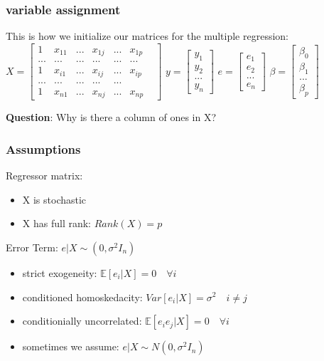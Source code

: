 \documentclass{beamer}
\begin{document}
\begin{frame}
\frametitle{variable assignment}
This is how we initialize our matrices for the multiple regression:
\bigskip
\bigskip
$
X = 
\begin{bmatrix} 
1 & x_{11} & ...& x_{1j} & ... & x_{1p} \\
...& ... & ... &...& ...& ...\\
1 & x_{i1} & ... & x_{ij} & ... &x_{ip}\\
... & ...& ...& ...& ...\\
1 & x_{n1} & ... & x_{nj}& ...& x_{np} & 
\end{bmatrix}
$
\quad
 $
 y = 
 \begin{bmatrix}
y_1 \\
y_2 \\
... \\
y_n 
\end{bmatrix}
$ 
 $
 e = 
 \begin{bmatrix}
e_1 \\
e_2 \\
... \\
e_n 
\end{bmatrix}
$  
 $
 \beta = 
 \begin{bmatrix}
\beta_0 \\
\beta_1 \\
... \\
\beta_p 
\end{bmatrix}
$  

\textbf{Question}: Why is there a column of ones in X?
\end{frame}

\begin{frame}
\frametitle{Assumptions}
Regressor matrix:
\begin{itemize}
\item X is stochastic
\item X has full rank: $Rank(X) = p$
\end{itemize}
\bigskip
Error Term:
$e|X \sim (0, \sigma^2 I_n)$
\begin{itemize}
\item strict exogeneity: $\mathbb{E}[e_i|X] = 0 \quad \forall i$ 
\item conditioned homoskedacity: $Var[e_i|X] = \sigma^2 \quad  i\neq j$
\item conditionially uncorrelated:  $\mathbb{E}[e_ie_j|X] = 0 \quad \forall i$ 
\item sometimes we assume: $e|X \sim N(0, \sigma^2 I_n)$
\end{itemize}
\end{frame}
\end{document}

